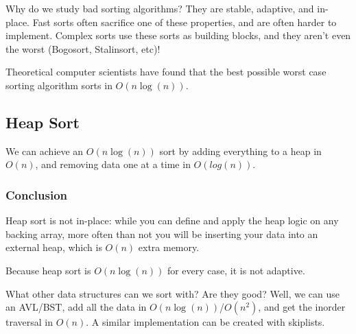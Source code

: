 \begin{note}
	Why do we study bad sorting algorithms? They are stable, adaptive, and in-place. Fast sorts often sacrifice one of these properties, and are often harder to implement. Complex sorts use these sorts as building blocks, and they aren't even the worst (Bogosort, Stalinsort, etc)!
\end{note}

\begin{note}
	Theoretical computer scientists have found that the best possible worst case sorting algorithm sorts in \( O(n\log (n)) \).
\end{note}

\subsection{Heap Sort}
We can achieve an \( O(n\log (n)) \) sort by adding everything to a heap in \( O(n) \), and removing data one at a time in \(  O(log(n)) \).

\subsubsection{Conclusion}
Heap sort is not in-place: while you can define and apply the heap logic on any backing array, more often than not you will be inserting your data into an external heap, which is \( O(n) \) extra memory.

Because heap sort is \( O(n\log (n)) \) for every case, it is not adaptive.

\begin{note}
	What other data structures can we sort with? Are they good? Well, we can use an AVL/BST, add all the data in \( O(n\log (n)) \)/\( O(n^2) \), and get the inorder traversal in \( O(n) \). A similar implementation can be created with skiplists.
\end{note}
